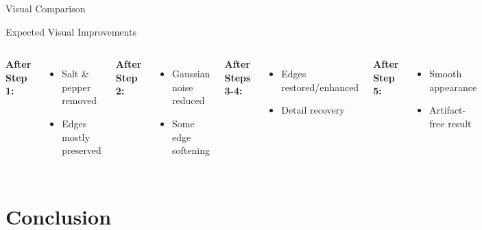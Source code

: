 \documentclass[aspectratio=169]{beamer}
\begin{document}
\begin{frame}{Visual Comparison}
    \begin{block}{Expected Visual Improvements}
        \begin{columns}
            \textbf{After Step 1:}
            \begin{itemize}
                \item Salt \& pepper removed
                \item Edges mostly preserved
            \end{itemize}
            
            \textbf{After Step 2:}
            \begin{itemize}
                \item Gaussian noise reduced
                \item Some edge softening
            \end{itemize}
            
            \textbf{After Steps 3-4:}
            \begin{itemize}
                \item Edges restored/enhanced
                \item Detail recovery
            \end{itemize}
            
            \textbf{After Step 5:}
            \begin{itemize}
                \item Smooth appearance
                \item Artifact-free result
            \end{itemize}
        \end{columns}
    \end{block}
\end{frame}


\section{Conclusion}
\end{document}
